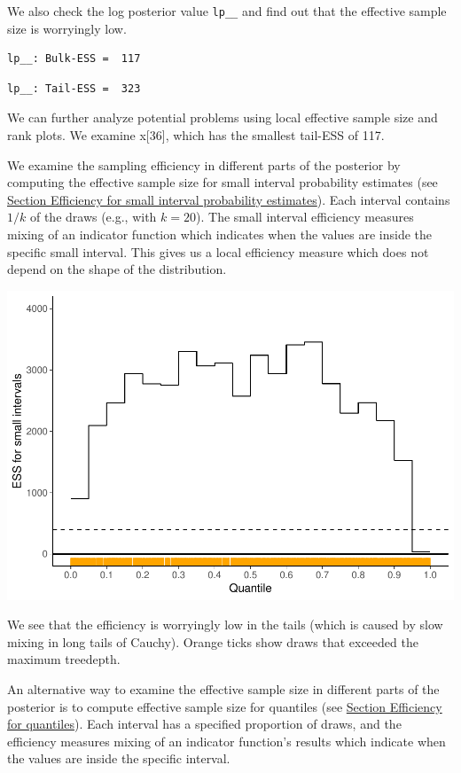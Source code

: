 \documentclass[american,]{article}
\begin{document}
We also check the log posterior value \texttt{lp\_\_} and find out that
the effective sample size is worryingly low.

\begin{verbatim}
lp__: Bulk-ESS =  117
\end{verbatim}

\begin{verbatim}
lp__: Tail-ESS =  323
\end{verbatim}

We can further analyze potential problems using local effective sample
size and rank plots. We examine x{[}36{]}, which has the smallest
tail-ESS of 117.

We examine the sampling efficiency in different parts of the posterior
by computing the effective sample size for small interval probability
estimates (see \protect\hyperlink{small_interval_S_eff}{Section
Efficiency for small interval probability estimates}). Each interval
contains \(1/k\) of the draws (e.g., with \(k=20\)). The small interval
efficiency measures mixing of an indicator function which indicates when
the values are inside the specific small interval. This gives us a local
efficiency measure which does not depend on the shape of the
distribution.

\includegraphics{graphics/local-ess-fit-nom-2-1.pdf}

We see that the efficiency is worryingly low in the tails (which is
caused by slow mixing in long tails of Cauchy). Orange ticks show draws
that exceeded the maximum treedepth.

An alternative way to examine the effective sample size in different
parts of the posterior is to compute effective sample size for quantiles
(see \protect\hyperlink{quantile_S_eff}{Section Efficiency for
quantiles}). Each interval has a specified proportion of draws, and the
efficiency measures mixing of an indicator function's results which
indicate when the values are inside the specific interval.
\end{document}
